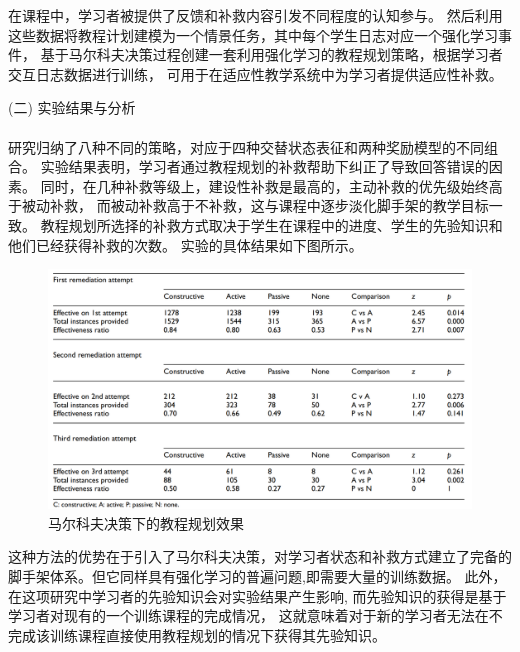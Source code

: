 \documentclass{article}
\begin{document}
            在课程中，学习者被提供了反馈和补救内容引发不同程度的认知参与。
            然后利用这些数据将教程计划建模为一个情景任务，其中每个学生日志对应一个强化学习事件，
            基于马尔科夫决策过程创建一套利用强化学习的教程规划策略，根据学习者交互日志数据进行训练，
            可用于在适应性教学系统中为学习者提供适应性补救。

            (二) 实验结果与分析\paragraph{}
            研究归纳了八种不同的策略，对应于四种交替状态表征和两种奖励模型的不同组合。
            实验结果表明，学习者通过教程规划的补救帮助下纠正了导致回答错误的因素。
            同时，在几种补救等级上，建设性补救是最高的，主动补救的优先级始终高于被动补救，
            而被动补救高于不补救，这与课程中逐步淡化脚手架的教学目标一致。
            教程规划所选择的补救方式取决于学生在课程中的进度、学生的先验知识和他们已经获得补救的次数。
            实验的具体结果如下图所示。

            \begin{figure}[H]
            	
            	\centering
            	\includegraphics[scale=0.25]{images/Markov_result.png}
            	\caption{马尔科夫决策下的教程规划效果}
            	\label{fig:label}
            \end{figure}

            这种方法的优势在于引入了马尔科夫决策，对学习者状态和补救方式建立了完备的脚手架体系。但它同样具有强化学习的普遍问题,即需要大量的训练数据。
            此外，在这项研究中学习者的先验知识会对实验结果产生影响,
            而先验知识的获得是基于学习者对现有的一个训练课程的完成情况，
            这就意味着对于新的学习者无法在不完成该训练课程直接使用教程规划的情况下获得其先验知识。
\end{document}

